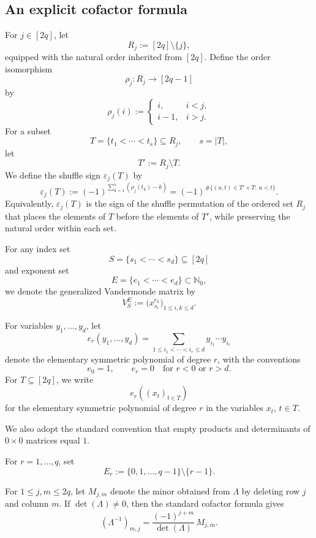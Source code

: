 \documentclass[11pt,a4paper]{article}
\theoremstyle{definition}
\begin{document}
\subsection{An explicit cofactor formula}

For \(j\in[2q]\), let
\[
R_j:=[2q]\setminus\{j\},
\]
equipped with the natural order inherited from \([2q]\). Define the order
isomorphism
\[
\rho_j:R_j\to[2q-1]
\]
by
\[
\rho_j(i):=
\begin{cases}
i, & i<j,\\
i-1, & i>j.
\end{cases}
\]
For a subset
\[
T=\{t_1<\cdots<t_s\}\subseteq R_j,
\qquad
s=|T|,
\]
let
\[
T':=R_j\setminus T.
\]
We define the shuffle sign \(\varepsilon_j(T)\) by
\begin{equation}\label{eq:epsilon-j}
\varepsilon_j(T)
:=
(-1)^{\sum_{k=1}^s(\rho_j(t_k)-k)}
=
(-1)^{\#\{(u,t)\in T'\times T:\ u<t\}}.
\end{equation}
Equivalently, $\varepsilon_j(T)$ is the sign of the shuffle permutation
of the ordered set $R_j$ that places the elements of $T$ before the
elements of $T'$, while preserving the natural order within each set.

For any index set
\[
S=\{s_1<\cdots<s_d\}\subseteq[2q]
\]
and exponent set
\[
E=\{e_1<\cdots<e_d\}\subset\mathbb N_0,
\]
we denote the generalized Vandermonde matrix by
\[
V_S^E
:=
\bigl(x_{s_i}^{e_k}\bigr)_{1\leq i,k\leq d}.
\]

For variables $y_1,\dots,y_d$, let
\[
e_r(y_1,\dots,y_d)
=
\sum_{1\le i_1<\cdots<i_r\le d}
y_{i_1}\cdots y_{i_r}
\]
denote the elementary symmetric polynomial of degree $r$, with the
conventions
\[
e_0=1,
\qquad
e_r=0 \quad \text{for } r<0 \text{ or } r>d.
\]
For $T\subseteq[2q]$, we write
\[
e_r\!\left((x_t)_{t\in T}\right)
\]
for the elementary symmetric polynomial of degree $r$ in the variables
$x_t$, $t\in T$.

We also adopt the standard convention that empty products and
determinants of \(0\times0\) matrices equal \(1\).

For \(r=1,\dots,q\), set
\[
E_r:=\{0,1,\dots,q-1\}\setminus\{r-1\}.
\]

For \(1\leq j,m\leq2q\), let \(M_{j,m}\) denote the minor obtained
from \(\Lambda\) by deleting row \(j\) and column \(m\). If
\(\det(\Lambda)\neq0\), then the standard cofactor formula gives
\begin{equation}\label{eq:inv-entry}
(\Lambda^{-1})_{m,j}
=
\frac{(-1)^{j+m}}{\det(\Lambda)}\,M_{j,m}.
\end{equation}
\end{document}
